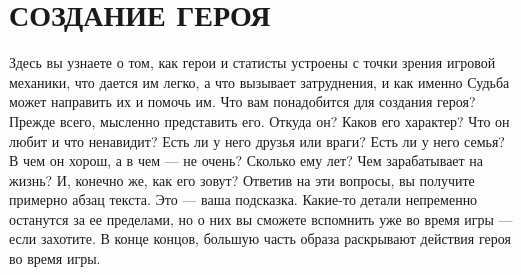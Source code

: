 \chapter{СОЗДАНИЕ ГЕРОЯ}
Здесь вы узнаете о том, как герои и статисты устроены с точки зрения игровой механики, что дается им легко, а что вызывает затруднения, и как именно Судьба может направить их и помочь им. Что вам понадобится для создания героя? Прежде всего, мысленно представить его. Откуда он? Каков его характер? Что он любит и что ненавидит? Есть ли у него друзья или враги? Есть ли у него семья? В чем он хорош, а в чем — не очень? Сколько ему лет? Чем зарабатывает на жизнь? И, конечно же, как его зовут? 
\newline
Ответив на эти вопросы, вы получите примерно абзац текста. Это — ваша подсказка. Какие-то детали непременно останутся за ее пределами, но о них вы сможете вспомнить уже во время игры — если захотите. В конце концов, большую часть образа раскрывают действия героя во время игры.


















